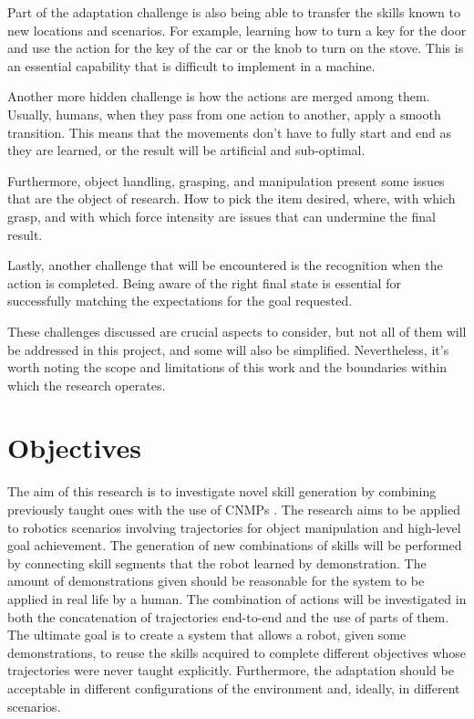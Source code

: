 Part of the adaptation challenge is also being able to transfer the skills known to new locations and scenarios. For example, learning how to turn a key for the door and use the action for the key of the car or the knob to turn on the stove. This is an essential capability that is difficult to implement in a machine.   

Another more hidden challenge is how the actions are merged among them. Usually, humans, when they pass from one action to another, apply a smooth transition. This means that the movements don't have to fully start and end as they are learned, or the result will be artificial and sub-optimal.   

Furthermore, object handling, grasping, and manipulation present some issues that are the object of research. How to pick the item desired, where,  with which grasp, and with which force intensity are issues that can undermine the final result.

Lastly, another challenge that will be encountered is the recognition when the action is completed. Being aware of the right final state is essential for successfully matching the expectations for the goal requested. 

These challenges discussed are crucial aspects to consider, but not all of them will be addressed in this project, and some will also be simplified. Nevertheless, it's worth noting the scope and limitations of this work and the boundaries within which the research operates.

\section{Objectives}
The aim of this research is to investigate novel skill generation by combining previously taught ones with the use of CNMPs \cite{Ugur-RSS-19}. 
The research aims to be applied to robotics scenarios involving trajectories for object manipulation and high-level goal achievement. 
The generation of new combinations of skills will be performed by connecting skill segments that the robot learned by demonstration. The amount of demonstrations given should be reasonable for the system to be applied in real life by a human. 
The combination of actions will be investigated in both the concatenation of trajectories end-to-end and the use of parts of them. 
The ultimate goal is to create a system that allows a robot, given some demonstrations, to reuse the skills acquired to complete different objectives whose trajectories were never taught explicitly. Furthermore, the adaptation should be acceptable in different configurations of the environment and, ideally, in different scenarios.


